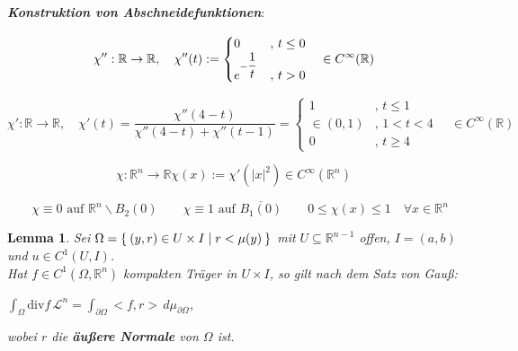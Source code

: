 \documentclass[11pt]{memoir}
\theoremstyle{changebreak}
\newtheorem{Lemma}{Lemma}[chapter]
\begin{document}
\par\bigskip
\emph{\textbf{Konstruktion von Abschneidefunktionen}}: 
\par\bigskip
\begin{equation}
	\chi '': \mathbb R \rightarrow \mathbb R, 
	\quad \chi''(t) :=
	\begin{cases}
		0 & , \,t \leq 0 \\
		e^{-\dfrac{1}{t}} & ,\,t > 0
	\end{cases}
	\quad \in C^\infty(\mathbb R) \\
\end{equation}
\par
\begin{equation}
	\chi': \mathbb R \rightarrow \mathbb R, \quad \chi'(t) =
	\dfrac{\chi''(4-t)}{\chi''(4-t) + \chi''(t-1)} =
	\begin{cases}
		1 & , \, t \leq 1 \\
		\in (0, 1) &, \, 1 < t < 4 \\
		0 & ,\, t \geq 4
	\end{cases}
	\quad \in C^\infty(\mathbb R)
\end{equation}
\par
\begin{equation}
	\chi: \mathbb R^n \rightarrow \mathbb R
	\chi(x) := \chi'(|x|^2) \in C^\infty (\mathbb R^n)
\end{equation}
\par
\begin{equation}
	\quad \chi \equiv 0 \text{ auf } \mathbb R^n\backslash B_2(0)
	\qquad \chi \equiv 1\text{ auf }\overline{B_1(0)}
	\qquad 0 \leq \chi(x) \leq 1 \quad \forall x \in \mathbb R^n
\end{equation}

\begin{Lemma}
Sei $\Omega = \Set{(y, r) \in U \times I | r < \mu(y)}$ mit $U \subseteq \mathbb R^{n-1}$ offen, $I = (a, b)$ und $u \in C^1(U, I)$. \\
Hat $f \in C^1(\Omega, \mathbb R^n)$ kompakten Träger in $U \times I$, so gilt nach dem Satz von Gauß:
\begin{center}
	$\int_{\Omega} \text{div} f \, \mathscr L^n = \int_{\partial \Omega} <f, r> \, d\mu_{\partial\Omega}$,
\end{center}
wobei $r$ die \textbf{äußere Normale} von $\Omega$ ist.
\end{Lemma}
\end{document}
